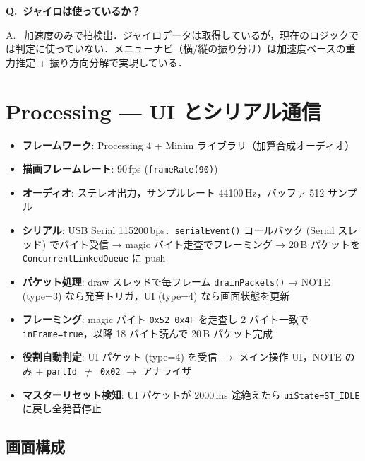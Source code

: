 \documentclass[uplatex,dvipdfmx,a4paper,10pt]{jsarticle}
\newcommand{\QA}[2]{%
  \par\noindent\textbf{\textcolor{qcolor}{Q.~#1}}%
  \par\noindent\textcolor{acolor}{A.~#2}\medskip%
}
\begin{document}
\QA{ジャイロは使っているか？}{
加速度のみで拍検出．ジャイロデータは取得しているが，現在のロジックでは判定に使っていない．メニューナビ（横/縦の振り分け）は加速度ベースの重力推定 + 振り方向分解で実現している．}

\section{Processing — UI とシリアル通信}

\begin{tcolorbox}[cheatbox, title=実装要点]
\begin{itemize}
  \item \textbf{フレームワーク}: Processing 4 + Minim ライブラリ（加算合成オーディオ）
  \item \textbf{描画フレームレート}: 90\,fps (\texttt{frameRate(90)})
  \item \textbf{オーディオ}: ステレオ出力，サンプルレート 44100\,Hz，バッファ 512 サンプル
  \item \textbf{シリアル}: USB Serial 115200\,bps．\texttt{serialEvent()} コールバック (Serial スレッド) でバイト受信 → magic バイト走査でフレーミング → 20\,B パケットを \texttt{ConcurrentLinkedQueue} に push
  \item \textbf{パケット処理}: draw スレッドで毎フレーム \texttt{drainPackets()} → NOTE (type=3) なら発音トリガ，UI (type=4) なら画面状態を更新
  \item \textbf{フレーミング}: magic バイト \texttt{0x52 0x4F} を走査し 2 バイト一致で \texttt{inFrame=true}，以降 18 バイト読んで 20\,B パケット完成
  \item \textbf{役割自動判定}: UI パケット (type=4) を受信 $\to$ メイン操作 UI，NOTE のみ + \texttt{partId $\ne$ 0x02} $\to$ アナライザ
  \item \textbf{マスターリセット検知}: UI パケットが 2000\,ms 途絶えたら \texttt{uiState=ST\_IDLE} に戻し全発音停止
\end{itemize}
\end{tcolorbox}

\subsection{画面構成}
\end{document}
